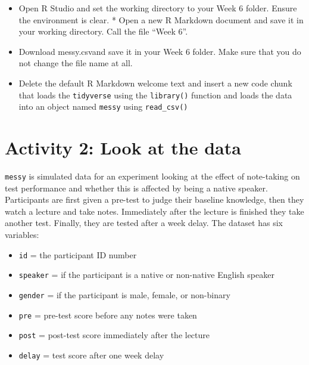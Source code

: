 \documentclass[]{book}
\providecommand{\tightlist}{%
  \setlength{\itemsep}{0pt}\setlength{\parskip}{0pt}}
\begin{document}
\begin{itemize}
\tightlist
\item
  Open R Studio and set the working directory to your Week 6 folder. Ensure the environment is clear. * Open a new R Markdown document and save it in your working directory. Call the file ``Week 6''.\\
\item
  Download messy.csvand save it in your Week 6 folder. Make sure that you do not change the file name at all.\\
\item
  Delete the default R Markdown welcome text and insert a new code chunk that loads the \texttt{tidyverse} using the \texttt{library()} function and loads the data into an object named \texttt{messy} using \texttt{read\_csv()}
\end{itemize}

\hypertarget{activity-2-look-at-the-data-2}{%
\section{Activity 2: Look at the data}\label{activity-2-look-at-the-data-2}}

\texttt{messy} is simulated data for an experiment looking at the effect of note-taking on test performance and whether this is affected by being a native speaker. Participants are first given a pre-test to judge their baseline knowledge, then they watch a lecture and take notes. Immediately after the lecture is finished they take another test. Finally, they are tested after a week delay. The dataset has six variables:

\begin{itemize}
\tightlist
\item
  \texttt{id} = the participant ID number\\
\item
  \texttt{speaker} = if the participant is a native or non-native English speaker\\
\item
  \texttt{gender} = if the participant is male, female, or non-binary\\
\item
  \texttt{pre} = pre-test score before any notes were taken\\
\item
  \texttt{post} = post-test score immediately after the lecture\\
\item
  \texttt{delay} = test score after one week delay
\end{itemize}
\end{document}
